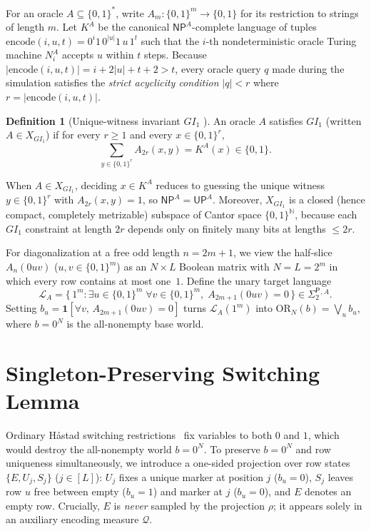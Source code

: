 \documentclass[11pt,a4paper]{article}
\theoremstyle{definition}
\newtheorem{definition}[theorem]{Definition}
\theoremstyle{remark}
\newcommand{\NP}{\mathsf{NP}}
\newcommand{\UP}{\mathsf{UP}}
\newcommand{\SigTwo}{\Sigma_2^{\mathsf{P}}}
\newcommand{\OR}{\mathrm{OR}}
\newcommand{\GI}{GI_1}
\begin{document}
For an oracle $A \subseteq \{0,1\}^*$, write $A_m : \{0,1\}^m \to \{0,1\}$ for its restriction to strings of length $m$. Let $K^A$ be the canonical $\NP^A$-complete language of tuples $\mathrm{encode}(i, u, t) = 0^i 1\, 0^{|u|} 1\, u\, 1^t$ such that the $i$-th nondeterministic oracle Turing machine $N_i^A$ accepts $u$ within $t$ steps. Because $|\mathrm{encode}(i, u, t)| = i + 2|u| + t + 2 > t$, every oracle query $q$ made during the simulation satisfies the \emph{strict acyclicity condition} $|q| < r$ where $r = |\mathrm{encode}(i, u, t)|$.

\begin{definition}[Unique-witness invariant $\GI$ \cite{GlasserWechsung2003}]
An oracle $A$ satisfies $\GI$ (written $A \in X_{\GI}$) if for every $r \ge 1$ and every $x \in \{0,1\}^r$,
\[
  \sum_{y \in \{0,1\}^r} A_{2r}(x, y) = K^A(x) \in \{0,1\}.
\]
\end{definition}

When $A \in X_{\GI}$, deciding $x \in K^A$ reduces to guessing the unique witness $y \in \{0,1\}^r$ with $A_{2r}(x, y) = 1$, so $\NP^A = \UP^A$. Moreover, $X_{\GI}$ is a closed (hence compact, completely metrizable) subspace of Cantor space $\{0,1\}^{\mathbb{N}}$, because each $\GI$ constraint at length $2r$ depends only on finitely many bits at lengths $\le 2r$.

For diagonalization at a free odd length $n = 2m + 1$, we view the half-slice $A_n(0uv)$ ($u, v \in \{0,1\}^m$) as an $N \times L$ Boolean matrix with $N = L = 2^m$ in which every row contains at most one~$1$. Define the unary target language
\[
  \mathcal{L}_A = \bigl\{\, 1^m : \exists u \in \{0,1\}^m\; \forall v \in \{0,1\}^m,\; A_{2m+1}(0uv) = 0 \,\bigr\} \in \SigTwo{}^{,A}.
\]
Setting $b_u = \mathbf{1}[\forall v,\, A_{2m+1}(0uv) = 0]$ turns $\mathcal{L}_A(1^m)$ into $\OR_N(b) = \bigvee_{u} b_u$, where $b = 0^N$ is the all-nonempty base world.

\section{Singleton-Preserving Switching Lemma}

Ordinary H\aa stad switching restrictions~\cite{Hastad1986} fix variables to both $0$ and $1$, which would destroy the all-nonempty world $b = 0^N$. To preserve $b = 0^N$ and row uniqueness simultaneously, we introduce a one-sided projection over row states $\{E, U_j, S_j\}$ ($j \in [L]$): $U_j$ fixes a unique marker at position $j$ ($b_u = 0$), $S_j$ leaves row $u$ free between empty ($b_u = 1$) and marker at $j$ ($b_u = 0$), and $E$ denotes an empty row. Crucially, $E$ is \emph{never} sampled by the projection $\rho$; it appears solely in an auxiliary encoding measure $\mathcal{Q}$.
\end{document}

